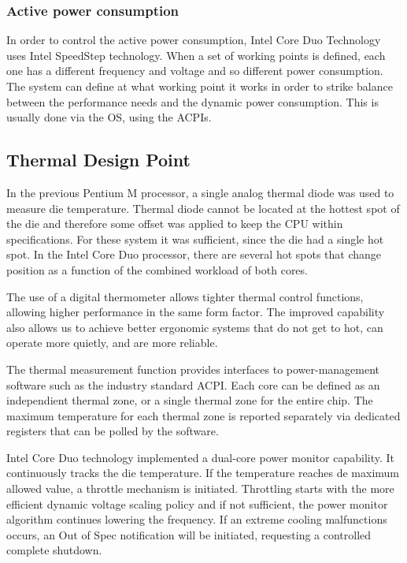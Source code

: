 \subsubsection{Active power consumption}
In order to control the active power consumption, Intel Core Duo Technology uses Intel SpeedStep technology. When a set of working points is defined, each one has a different frequency and voltage and so different power consumption. The system can define at what working point it works in order to strike balance between the performance needs and the dynamic power consumption. This is usually done via the OS, using the ACPIs.

\subsection{Thermal Design Point}
In the previous Pentium M processor, a single analog thermal diode was used to measure die temperature. Thermal diode cannot be located at the hottest spot of the die and therefore some offset was applied to keep the CPU within specifications. For these system it was sufficient, since the die had a single hot spot. In the Intel Core Duo processor, there are several hot spots that change position as a function of the combined workload of both cores.

The use of a digital thermometer allows tighter thermal control functions, allowing higher performance in the same form factor. The improved capability also allows us to achieve better ergonomic systems that do not get to hot, can operate more quietly, and are more reliable.

The thermal measurement function provides interfaces to power-management software such as the industry standard ACPI. Each core can be defined as an independient thermal zone, or a single thermal zone for the entire chip. The maximum temperature for each thermal zone is reported separately via dedicated registers that can be polled by the software.

Intel Core Duo technology implemented a dual-core power monitor capability. It continuously tracks the die temperature. If the temperature reaches de maximum allowed value, a throttle mechanism is initiated. Throttling starts with the more efficient dynamic voltage scaling policy and if not sufficient, the power monitor algorithm continues lowering the frequency. If an extreme cooling malfunctions occurs, an Out of Spec notification will be initiated, requesting a controlled complete shutdown.

